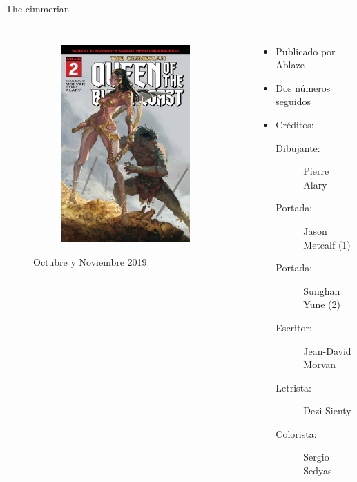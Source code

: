 \begin{frame}{The cimmerian}
\begin{columns}
\begin{figure}[htb]
\begin{subfigure}[b]{0.4\textwidth}
				\includegraphics[width=\textwidth]{img/ablazeTC2}
			\end{subfigure}
			\caption{Octubre y Noviembre 2019}
		\end{figure}
		\begin{itemize}
			\item Publicado por Ablaze
			\item Dos números seguidos
			\item Créditos:
			\begin{description}
				\item[Dibujante:] Pierre Alary
				\item[Portada:] Jason Metcalf (1)
				\item[Portada:]  Sunghan Yune (2)
				\item[Escritor:] Jean-David Morvan
				\item[Letrista:] Dezi Sienty
				\item[Colorista:] Sergio Sedyas
			\end{description}
		\end{itemize}
	\end{columns}
\end{frame}
\note[itemize]{
	\item
}


